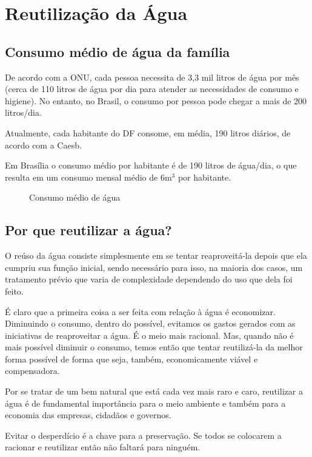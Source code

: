 \section{Reutilização da Água}
\subsection{Consumo médio de água da família}

	De acordo com a ONU, cada pessoa necessita de 3,3 mil litros de água por mês (cerca de 110 litros de água por dia para atender as necessidades de consumo e higiene). No entanto, no Brasil, o consumo por pessoa pode chegar a mais de 200 litros/dia. 

	Atualmente, cada habitante do DF consome, em média, 190 litros diários, de acordo com a Caesb.

	Em Brasília o consumo médio por habitante é de 190 litros de água/dia, o que resulta em um consumo mensal médio de 6m$^{3}$ por habitante.
\begin{figure}
\centering
\caption{Consumo médio de água \cite{table1}}

\end{figure}

\subsection{Por que reutilizar a água?}

	O reúso da água consiste simplesmente em se tentar reaproveitá-la depois que ela cumpriu sua função inicial, sendo necessário para isso, na maioria dos casos, um tratamento prévio que varia de complexidade dependendo do uso que dela foi feito.

	É claro que a primeira coisa a ser feita com relação à água é economizar. Diminuindo o consumo, dentro do possível, evitamos os gastos gerados com as iniciativas de reaproveitar a água. É o meio mais racional. Mas, quando não é mais possível diminuir o consumo, temos então que tentar reutilizá-la da melhor forma possível de forma que seja, também, economicamente viável e compensadora.

	Por se tratar de um bem natural que está cada vez mais raro e caro, 
reutilizar a água é de fundamental importância para o meio ambiente e também 
para a economia das empresas, cidadãos e governos.

Evitar o desperdício é a chave para a preservação. Se todos se colocarem a racionar e reutilizar então não faltará para ninguém.

